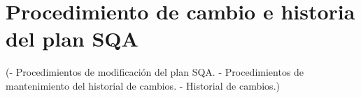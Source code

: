 \documentclass[spanish,a4paper,12pt, twoside]{report}	%
\begin{document}
\newpage
\mbox{}
\thispagestyle{empty}						%
\newpage

\chapter{ Procedimiento de cambio e historia del plan SQA}
	(- Procedimientos de modificación del plan SQA.
	- Procedimientos de mantenimiento del historial de
	cambios.
	- Historial de cambios.)
	


\newpage
\mbox{}
\thispagestyle{empty}						%
\newpage
\end{document}

